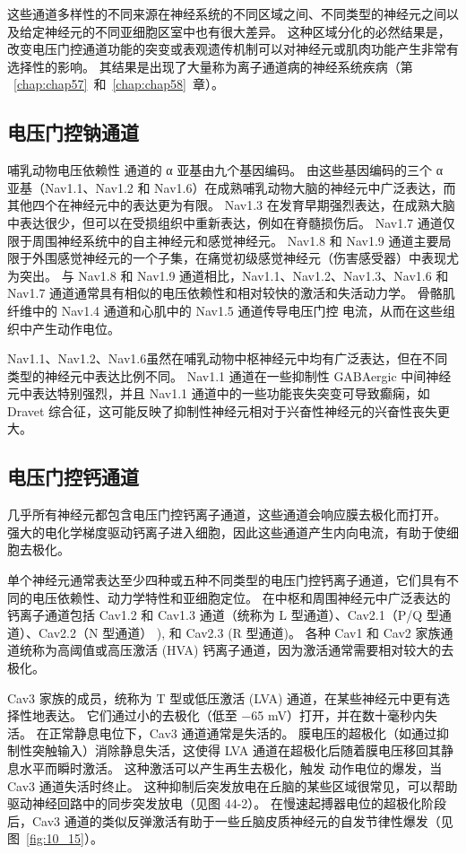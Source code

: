 这些通道多样性的不同来源在神经系统的不同区域之间、不同类型的神经元之间以及给定神经元的不同亚细胞区室中也有很大差异。
这种区域分化的必然结果是，改变电压门控通道功能的突变或表观遗传机制可以对神经元或肌肉功能产生非常有选择性的影响。
其结果是出现了大量称为离子通道病的神经系统疾病（第 ~\ref{chap:chap57}~和~\ref{chap:chap58}~章）。



\subsection{电压门控钠通道}

哺乳动物电压依赖性  通道的 α 亚基由九个基因编码。 由这些基因编码的三个 α 亚基（Nav1.1、Nav1.2 和 Nav1.6）在成熟哺乳动物大脑的神经元中广泛表达，而其他四个在神经元中的表达更为有限。 Nav1.3 在发育早期强烈表达，在成熟大脑中表达很少，但可以在受损组织中重新表达，例如在脊髓损伤后。 Nav1.7 通道仅限于周围神经系统中的自主神经元和感觉神经元。
Nav1.8 和 Nav1.9 通道主要局限于外围感觉神经元的一个子集，在痛觉初级感觉神经元（伤害感受器）中表现尤为突出。
与 Nav1.8 和 Nav1.9 通道相比，Nav1.1、Nav1.2、Nav1.3、Nav1.6 和 Nav1.7 通道通常具有相似的电压依赖性和相对较快的激活和失活动力学。 
骨骼肌纤维中的 Nav1.4 通道和心肌中的 Nav1.5 通道传导电压门控  电流，从而在这些组织中产生动作电位。


Nav1.1、Nav1.2、Nav1.6虽然在哺乳动物中枢神经元中均有广泛表达，但在不同类型的神经元中表达比例不同。
Nav1.1 通道在一些抑制性 GABAergic 中间神经元中表达特别强烈，并且 Nav1.1 通道中的一些功能丧失突变可导致癫痫，如 Dravet 综合征，这可能反映了抑制性神经元相对于兴奋性神经元的兴奋性丧失更大。



\subsection{电压门控钙通道}

几乎所有神经元都包含电压门控钙离子通道，这些通道会响应膜去极化而打开。
强大的电化学梯度驱动钙离子进入细胞，因此这些通道产生内向电流，有助于使细胞去极化。


单个神经元通常表达至少四种或五种不同类型的电压门控钙离子通道，它们具有不同的电压依赖性、动力学特性和亚细胞定位。
在中枢和周围神经元中广泛表达的钙离子通道包括 Cav1.2 和 Cav1.3 通道（统称为 L 型通道）、Cav2.1（P/Q 型通道）、Cav2.2（N 型通道） ), 和 Cav2.3 (R 型通道)。
各种 Cav1 和 Cav2 家族通道统称为高阈值或高压激活 (HVA) 钙离子通道，因为激活通常需要相对较大的去极化。


Cav3 家族的成员，统称为 T 型或低压激活 (LVA) 通道，在某些神经元中更有选择性地表达。
它们通过小的去极化（低至 −65 mV）打开，并在数十毫秒内失活。
在正常静息电位下，Cav3 通道通常是失活的。
膜电压的超极化（如通过抑制性突触输入）消除静息失活，这使得 LVA 通道在超极化后随着膜电压移回其静息水平而瞬时激活。 
这种激活可以产生再生去极化，触发  动作电位的爆发，当 Cav3 通道失活时终止。 
这种抑制后突发放电在丘脑的某些区域很常见，可以帮助驱动神经回路中的同步突发放电（见图 44-2）。 
在慢速起搏器电位的超极化阶段后，Cav3 通道的类似反弹激活有助于一些丘脑皮质神经元的自发节律性爆发（见图~\ref{fig:10_15}）。



